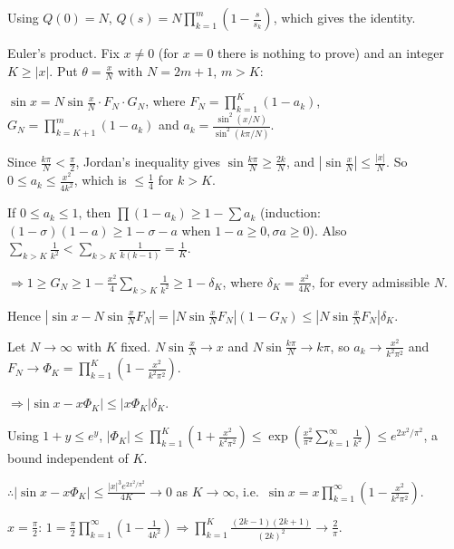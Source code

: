   Using $Q(0) = N$, $Q(s) = N\displaystyle\prod_{k = 1}^m\left(1 - \frac{s}{s_k}\right)$, which gives the
  identity.

  Euler's product. Fix $x\neq 0$ (for $x = 0$ there is nothing to prove) and an integer $K\geq|x|$. Put $\theta
  = \frac{x}{N}$ with $N = 2m + 1$, $m > K$:

  $\sin x = N\sin\frac{x}{N}\cdot F_N\cdot G_N$, where $F_N = \displaystyle\prod_{k = 1}^K(1 - a_k)$, $G_N
  = \displaystyle\prod_{k = K + 1}^m(1 - a_k)$ and $a_k = \frac{\sin^2(x/N)}{\sin^2(k\pi/N)}$.

  Since $\frac{k\pi}{N} < \frac{\pi}{2}$, Jordan's inequality gives $\sin\frac{k\pi}{N}\geq\frac{2k}{N}$, and
  $\left|\sin\frac{x}{N}\right|\leq\frac{|x|}{N}$. So $0\leq a_k\leq\frac{x^2}{4k^2}$, which is $\leq\frac{1}{4}$
  for $k > K$.

  If $0\leq a_k\leq 1$, then $\prod(1 - a_k)\geq 1 - \sum a_k$ (induction: $(1 - \sigma)(1 - a)\geq 1 -
  \sigma - a$ when $1 - a\geq 0, \sigma a\geq 0$). Also $\displaystyle\sum_{k > K}\frac{1}{k^2} < \sum_{k >
    K}\frac{1}{k(k - 1)} = \frac{1}{K}$.

  $\Rightarrow 1\geq G_N\geq 1 - \frac{x^2}{4}\displaystyle\sum_{k > K}\frac{1}{k^2}\geq 1 - \delta_K$, where
  $\delta_K = \frac{x^2}{4K}$, for every admissible $N$.

  Hence $\left|\sin x - N\sin\frac{x}{N}F_N\right| = \left|N\sin\frac{x}{N}F_N\right|(1 - G_N)\leq\left|N\sin\frac{x}{N}F_N\right|\delta_K$.

  Let $N\to\infty$ with $K$ fixed. $N\sin\frac{x}{N}\to x$ and $N\sin\frac{k\pi}{N}\to k\pi$, so $a_k\to\frac{x^2}{k^2\pi^2}$
  and $F_N\to\Phi_K = \displaystyle\prod_{k = 1}^K\left(1 - \frac{x^2}{k^2\pi^2}\right)$.

  $\Rightarrow|\sin x - x\Phi_K|\leq|x\Phi_K|\delta_K$.

  Using $1 + y\leq e^y$, $|\Phi_K|\leq\displaystyle\prod_{k = 1}^K\left(1 + \frac{x^2}{k^2\pi^2}\right)\leq\exp\left(\frac{x^2}{\pi^2}\sum_{k
    = 1}^\infty\frac{1}{k^2}\right)\leq e^{2x^2/\pi^2}$, a bound independent of $K$.

  $\therefore|\sin x - x\Phi_K|\leq\frac{|x|^3e^{2x^2/\pi^2}}{4K}\to 0$ as $K\to\infty$, i.e.\ $\sin x =
  x\displaystyle\prod_{k = 1}^\infty\left(1 - \frac{x^2}{k^2\pi^2}\right)$.
\item $x = \frac{\pi}{2}$: $1 = \frac{\pi}{2}\displaystyle\prod_{k = 1}^\infty\left(1 -
  \frac{1}{4k^2}\right)\Rightarrow\prod_{k = 1}^K\frac{(2k - 1)(2k + 1)}{(2k)^2}\to\frac{2}{\pi}$.

